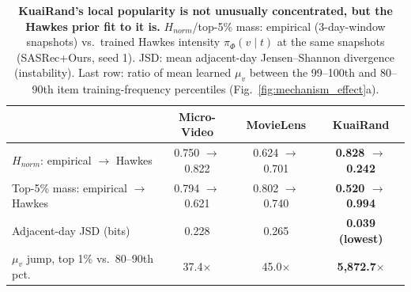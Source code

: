 \begin{table}[t]
\centering
\caption{\textbf{KuaiRand's local popularity is not unusually concentrated, but the
Hawkes prior fit to it is.} $H_{norm}$/top-5\% mass: empirical (3-day-window snapshots)
vs.\ trained Hawkes intensity $\pi_\Phi(v\mid t)$ at the same snapshots (SASRec+Ours,
seed 1). JSD: mean adjacent-day Jensen--Shannon divergence (instability). Last row: ratio
of mean learned $\mu_v$ between the 99--100th and 80--90th item training-frequency
percentiles (Fig.~\ref{fig:mechanism_effect}a).}
\label{tab:kuairand_concentration_evidence}
\begin{tabular}{l ccc}
\toprule
 & Micro-Video & MovieLens & KuaiRand \\
\midrule
$H_{norm}$: empirical $\to$ Hawkes & 0.750 $\to$ 0.822 & 0.624 $\to$ 0.701 & \textbf{0.828 $\to$ 0.242} \\
Top-5\% mass: empirical $\to$ Hawkes & 0.794 $\to$ 0.621 & 0.802 $\to$ 0.740 & \textbf{0.520 $\to$ 0.994} \\
Adjacent-day JSD (bits) & 0.228 & 0.265 & \textbf{0.039 (lowest)} \\
$\mu_v$ jump, top 1\% vs.\ 80--90th pct.\ & 37.4$\times$ & 45.0$\times$ & \textbf{5{,}872.7$\times$} \\
\bottomrule
\end{tabular}
\end{table}
